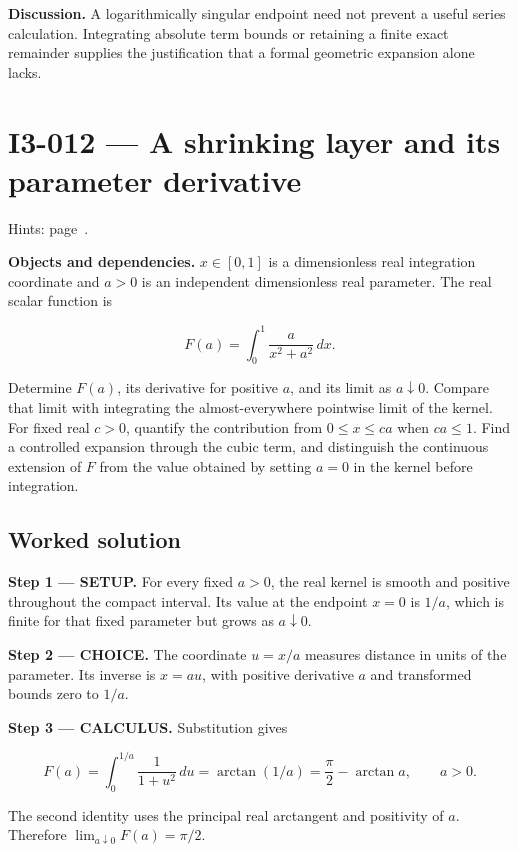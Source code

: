 \documentclass[11pt,oneside,openany]{book}
\begin{document}
\textbf{Discussion.} A logarithmically singular endpoint need not prevent a useful series calculation. Integrating absolute term bounds or retaining a finite exact remainder supplies the justification that a formal geometric expansion alone lacks.
\clearpage
\section{I3-012 --- A shrinking layer and its parameter derivative}
\label{problem:I3-012}
{\small Hints: page~\pageref{hints:I3-012}.}\par\medskip

\textbf{Objects and dependencies.} \(x\in[0,1]\) is a dimensionless real integration coordinate and \(a>0\) is an independent dimensionless real parameter. The real scalar function is

\[
F(a)=\int_0^1\frac{a}{x^2+a^2}\,dx.
\]

Determine \(F(a)\), its derivative for positive \(a\), and its limit as \(a\downarrow0\). Compare that limit with integrating the almost-everywhere pointwise limit of the kernel. For fixed real \(c>0\), quantify the contribution from \(0\le x\le ca\) when \(ca\le1\). Find a controlled expansion through the cubic term, and distinguish the continuous extension of \(F\) from the value obtained by setting \(a=0\) in the kernel before integration.
\subsection*{Worked solution}

\textbf{Step 1 --- SETUP.} For every fixed \(a>0\), the real kernel is smooth and positive throughout the compact interval. Its value at the endpoint \(x=0\) is \(1/a\), which is finite for that fixed parameter but grows as \(a\downarrow0\).

\begin{ChoiceStep}
\textbf{Step 2 --- CHOICE.} The coordinate \(u=x/a\) measures distance in units of the parameter. Its inverse is \(x=au\), with positive derivative \(a\) and transformed bounds zero to \(1/a\).

\end{ChoiceStep}
\textbf{Step 3 --- CALCULUS.} Substitution gives

\[
F(a)=\int_0^{1/a}\frac1{1+u^2}\,du
=\arctan(1/a)=\frac\pi2-\arctan a,\qquad a>0.
\]

The second identity uses the principal real arctangent and positivity of \(a\). Therefore \(\lim_{a\downarrow0}F(a)=\pi/2\).
\end{document}
